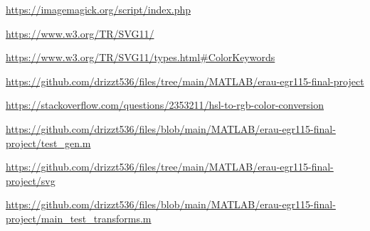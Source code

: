 \documentclass[12pt]{article}
\begin{document}
\begin{enumerate}[label={[1]}]
	\item \url{https://imagemagick.org/script/index.php}
	\label{imagemagick}
\end{enumerate}
\vspace{-23px}
\begin{enumerate}[label={[2]}]
	\item \url{https://www.w3.org/TR/SVG11/}
	\label{svg docs}
\end{enumerate}
\vspace{-23px}
\begin{enumerate}[label={[3]}]
	\item \url{https://www.w3.org/TR/SVG11/types.html#ColorKeywords}
	\label{svg named colors}
\end{enumerate}
\vspace{-23px}
\begin{enumerate}[label={[4]}]
	\item \url{https://github.com/drizzt536/files/tree/main/MATLAB/erau-egr115-final-project}
	\label{code folder}
\end{enumerate}
\vspace{-23px}
\begin{enumerate}[label={[5]}]
	\item \url{https://stackoverflow.com/questions/2353211/hsl-to-rgb-color-conversion}
	\label{hsl2rgb}
\end{enumerate}
\vspace{-23px}
\begin{enumerate}[label={[6]}]
	\item \url{https://github.com/drizzt536/files/blob/main/MATLAB/erau-egr115-final-project/test_gen.m}
	\label{test suite}
\end{enumerate}
\vspace{-23px}
\begin{enumerate}[label={[7]}]
	\item \url{https://github.com/drizzt536/files/tree/main/MATLAB/erau-egr115-final-project/svg}
	\label{svg folder}
\end{enumerate}
\vspace{-23px}
\begin{enumerate}[label={[8]}]
	\item \url{https://github.com/drizzt536/files/blob/main/MATLAB/erau-egr115-final-project/main_test_transforms.m}
	\label{tfm tests}
\end{enumerate}
\end{document}
